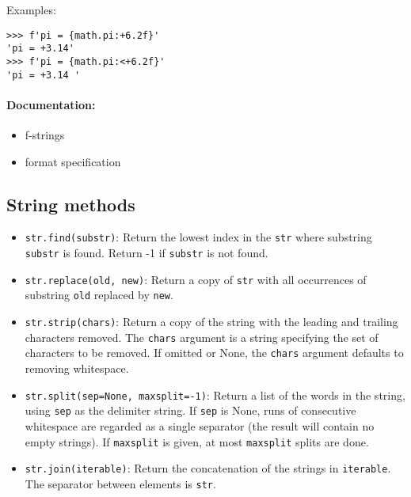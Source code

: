 \documentclass[12pt]{article}
\begin{document}
Examples:
\begin{verbatim}
>>> f'pi = {math.pi:+6.2f}'
'pi = +3.14'
>>> f'pi = {math.pi:<+6.2f}'
'pi = +3.14 '
\end{verbatim}


\paragraph{Documentation:}

\begin{itemize}
    \item f-strings
    \item format specification
\end{itemize}

\subsection{String methods}

\begin{itemize}
    \item \texttt{str.find(substr)}: Return the lowest index in the \texttt{str} where substring \texttt{substr} is found. Return -1 if \texttt{substr} is not found.
    \item \texttt{str.replace(old, new)}: Return a copy of \texttt{str} with all occurrences of substring \texttt{old} replaced by \texttt{new}.
    \item \texttt{str.strip(chars)}: Return a copy of the string with the leading and trailing characters removed. The \texttt{chars} argument is a string specifying the set of characters to be removed. If omitted or None, the \texttt{chars} argument defaults to removing whitespace.
\end{itemize}




\begin{itemize}
    \item \texttt{str.split(sep=None, maxsplit=-1)}: Return a list of the words in the string, using \texttt{sep} as the delimiter string. If \texttt{sep} is None, runs of consecutive whitespace are regarded as a single separator (the result will contain no empty strings). If \texttt{maxsplit} is given, at most \texttt{maxsplit} splits are done.
    \item \texttt{str.join(iterable)}: Return the concatenation of the strings in \texttt{iterable}. The separator between elements is \texttt{str}.
\end{itemize}
\end{document}
